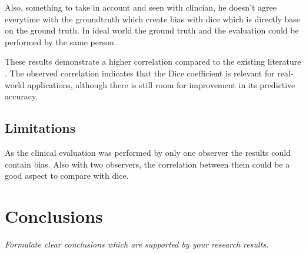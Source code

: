 Also, something to take in account and seen with clincian, he doesn't agree everytime with the groundtruth which create bias with dice which is directly base on the ground truth. In ideal
world the ground truth and the evaluation could be performed by the same person.

These results demonstrate a higher correlation compared to the existing literature \cite{Kofler2023}. The observed correlation indicates that the Dice coefficient is relevant for real-world applications, although there is still room for improvement in its predictive accuracy.

\subsection{Limitations}
As the clinical evaluation was performed by only one observer the results could contain bias. Also with two observers, the correlation between them could be
a good aspect to compare with dice.


\newpage
\section{Conclusions}

\textit{Formulate clear conclusions which are supported by your research results.}

\endinput